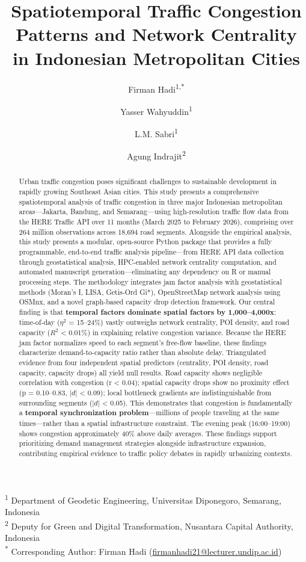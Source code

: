 \documentclass[12pt,a4paper]{article}
\title{Spatiotemporal Traffic Congestion Patterns and Network Centrality in Indonesian Metropolitan Cities}
\author{%
  Firman Hadi\textsuperscript{1,*} \and
  Yasser Wahyuddin\textsuperscript{1} \and
  L.M. Sabri\textsuperscript{1} \and
  Agung Indrajit\textsuperscript{2}%
}
\date{}
\begin{document}
\maketitle

\noindent\textsuperscript{1} Department of Geodetic Engineering, Universitas Diponegoro, Semarang, Indonesia\\
\textsuperscript{2} Deputy for Green and Digital Transformation, Nusantara Capital Authority, Indonesia\\[6pt]
\textsuperscript{*} Corresponding Author: Firman Hadi (\href{mailto:firmanhadi21@lecturer.undip.ac.id}{firmanhadi21@lecturer.undip.ac.id})

\bigskip

\begin{abstract}
Urban traffic congestion poses significant challenges to sustainable development in rapidly growing Southeast Asian cities. This study presents a comprehensive spatiotemporal analysis of traffic congestion in three major Indonesian metropolitan areas---Jakarta, Bandung, and Semarang---using high-resolution traffic flow data from the HERE Traffic API over 11 months (March 2025 to February 2026), comprising over 264 million observations across 18,694 road segments. Alongside the empirical analysis, this study presents a modular, open-source Python package that provides a fully programmable, end-to-end traffic analysis pipeline---from HERE API data collection through geostatistical analysis, HPC-enabled network centrality computation, and automated manuscript generation---eliminating any dependency on R or manual processing steps. The methodology integrates jam factor analysis with geostatistical methods (Moran's I, LISA, Getis-Ord Gi*), OpenStreetMap network analysis using OSMnx, and a novel graph-based capacity drop detection framework. Our central finding is that \textbf{temporal factors dominate spatial factors by 1,000--4,000x}: time-of-day ($\eta^2$ = 15--24\%) vastly outweighs network centrality, POI density, and road capacity ($R^2$ < 0.01\%) in explaining relative congestion variance. Because the HERE jam factor normalizes speed to each segment's free-flow baseline, these findings characterize demand-to-capacity ratio rather than absolute delay. Triangulated evidence from four independent spatial predictors (centrality, POI density, road capacity, capacity drops) all yield null results. Road capacity shows negligible correlation with congestion (r < 0.04); spatial capacity drops show no proximity effect (p = 0.10--0.83, $|d|$ < 0.09); local bottleneck gradients are indistinguishable from surrounding segments ($|d|$ < 0.05). This demonstrates that congestion is fundamentally a \textbf{temporal synchronization problem}---millions of people traveling at the same times---rather than a spatial infrastructure constraint. The evening peak (16:00--19:00) shows congestion approximately 40\% above daily averages. These findings support prioritizing demand management strategies alongside infrastructure expansion, contributing empirical evidence to traffic policy debates in rapidly urbanizing contexts.
\end{abstract}
\end{document}
